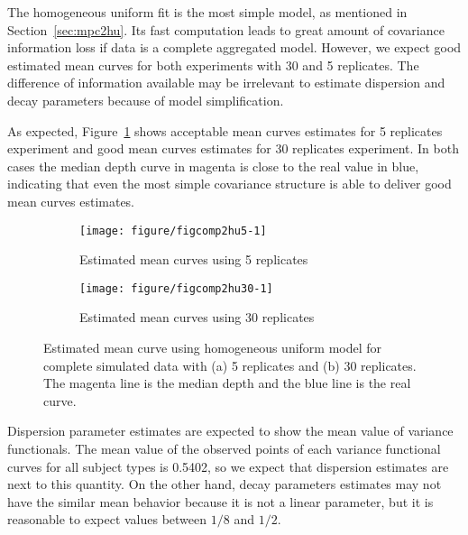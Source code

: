 The homogeneous uniform fit is the most simple model, as mentioned in Section~\ref{sec:mpc2hu}. Its fast computation leads to great amount of covariance information loss if data is a complete aggregated model. However, we expect good estimated mean curves for both experiments with 30 and 5 replicates. The difference of information available may be irrelevant to estimate dispersion and decay parameters because of model simplification.

As expected, Figure~\ref{fig:mpc-comp2hu} shows acceptable mean curves estimates for 5 replicates experiment and good mean curves estimates for 30 replicates experiment. In both cases the median depth curve in magenta is close to the real value in blue, indicating that even the most simple covariance structure is able to deliver good mean curves estimates.


\begin{figure}[t]
  \begin{subfigure}{\textwidth}
    \centering
\begin{knitrout}
\color{fgcolor}
\texttt{[image: figure/figcomp2hu5-1]} 

\end{knitrout}
    \caption{Estimated mean curves using 5 replicates}
  \end{subfigure}
    \begin{subfigure}{\textwidth}
      \centering
\begin{knitrout}
\color{fgcolor}
\texttt{[image: figure/figcomp2hu30-1]} 

\end{knitrout}
    \caption{Estimated mean curves using 30 replicates}
  \end{subfigure}
  \caption{Estimated mean curve using homogeneous uniform model for complete simulated data with (a) 5 replicates and (b) 30 replicates. The magenta line is the median depth and the blue line is the real curve.}
  \label{fig:mpc-comp2hu}
\end{figure}


Dispersion parameter estimates are expected to show the mean value of variance functionals. The mean value of the observed points of each variance functional curves for all subject types is 0.5402, so we expect that dispersion estimates are next to this quantity. On the other hand, decay parameters estimates may not have the similar mean behavior because it is not a linear parameter, but it is reasonable to expect values between $1/8$ and $1/2$.

